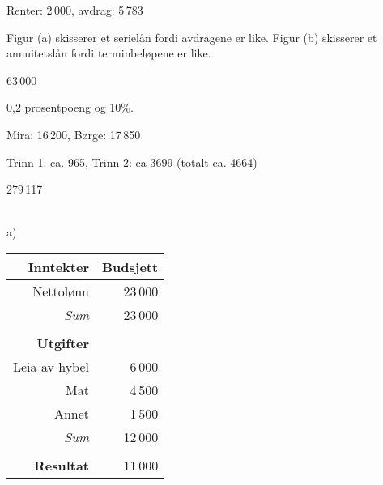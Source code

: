  Renter: 2\,000, avdrag: 5\,783

 Figur (a) skisserer et serielån fordi avdragene er like. Figur (b) skisserer et annuitetslån fordi terminbeløpene er like.

 63\,000

 0,2 prosentpoeng og 10\%.



 Mira: 16\,200, Børge: 17\,850

 Trinn 1: ca. 965, Trinn 2: ca 3699 (totalt ca. 4664)


 279\,117

\\
a)\\
\begin{tabular}{r r}
	\textbf{Inntekter} & Budsjett \\ \hline 
	Nettolønn & 23\,000 \\ \hline
	\textit{Sum} & 23\,000 \\ \hline \\
	\textbf{Utgifter} & \\ \hline
	Leia av hybel & 6\,000 \\
	Mat & 4\,500 \\
	Annet & 1\,500\\ \hline
	\textit{Sum} & 12\,000\\ \hline \\ \hline
	
	\textbf{Resultat} & 11\,000\\ \hline
\end{tabular}\vsk

